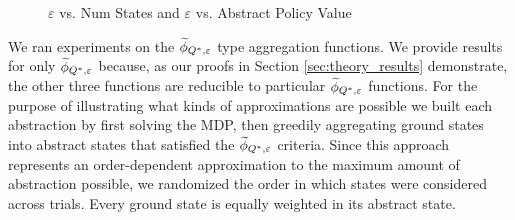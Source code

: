 \begin{figure}[t]
\caption{$\varepsilon$ vs. Num States and $\varepsilon$ vs. Abstract Policy Value\label{fig:main_empirical_results1}}
\end{figure}

We ran experiments on the $\widetilde \phi_{Q^*,\varepsilon}$ type aggregation functions. We provide results for only $\widetilde \phi_{Q^*,\varepsilon}$ because, as our proofs in Section \ref{sec:theory_results} demonstrate, the other three functions are reducible to particular $\widetilde \phi_{Q^*,\varepsilon}$ functions. For the purpose of illustrating what kinds of approximations are possible we built each abstraction by first solving the MDP, then greedily aggregating ground states into abstract states that satisfied the $\widetilde \phi_{Q^*,\varepsilon}$ criteria. Since this approach represents an order-dependent approximation to the maximum amount of abstraction possible, we randomized the order in which states were considered across trials. Every ground state is equally weighted in its abstract state.

